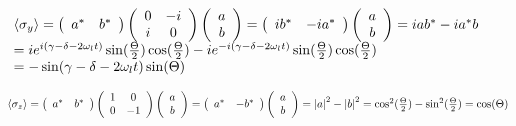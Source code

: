 $\begin{array}{l}
 \left\langle {\sigma _y } \right\rangle  = \left( {\begin{array}{*{20}c}
   {a^* } & {b^* }  \\
\end{array}} \right)\left( {\begin{array}{*{20}c}
   0 & { - i}  \\
   i & 0  \\
\end{array}} \right)\left( {\begin{array}{*{20}c}
   a  \\
   b  \\
\end{array}} \right) = \left( {\begin{array}{*{20}c}
   {ib^* } & { - ia^* }  \\
\end{array}} \right)\left( {\begin{array}{*{20}c}
   a  \\
   b  \\
\end{array}} \right) = iab^*  - ia^* b \\
  = ie^{i(\gamma  - \delta  - 2\omega _l t)} \sin ({\textstyle{\Theta  \over 2}})\cos ({\textstyle{\Theta  \over 2}}) - ie^{ - i(\gamma  - \delta  - 2\omega _l t)} \sin ({\textstyle{\Theta  \over 2}})\cos ({\textstyle{\Theta  \over 2}}) \\
  =  - \sin (\gamma  - \delta  - 2\omega _l t)\sin (\Theta ) \\
 \end{array}$


$\left\langle {\sigma _z } \right\rangle  = \left( {\begin{array}{*{20}c}
   {a^* } & {b^* }  \\
\end{array}} \right)\left( {\begin{array}{*{20}c}
   1 & 0  \\
   0 & { - 1}  \\
\end{array}} \right)\left( {\begin{array}{*{20}c}
   a  \\
   b  \\
\end{array}} \right) = \left( {\begin{array}{*{20}c}
   {a^* } & { - b^* }  \\
\end{array}} \right)\left( {\begin{array}{*{20}c}
   a  \\
   b  \\
\end{array}} \right) = \left| a \right|^2  - \left| b \right|^2  = \cos ^2 ({\textstyle{\Theta  \over 2}}) - \sin ^2 ({\textstyle{\Theta  \over 2}}) = \cos (\Theta )$


